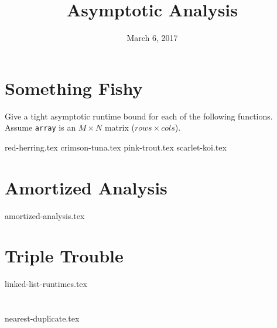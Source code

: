 \documentclass{exam}
\title{Asymptotic Analysis}
\date{March 6, 2017}
\begin{document}
\maketitle

\section{Something Fishy}
Give a tight asymptotic runtime bound for each of the following functions. Assume \texttt{array} is an $M \times N$ matrix ($rows \times cols$).
\begin{questions}
{red-herring.tex}
{crimson-tuna.tex}
{pink-trout.tex}
{scarlet-koi.tex}
\end{questions}

\section{Amortized Analysis}
\begin{questions}
{amortized-analysis.tex}
\end{questions}

\clearpage

\section{Triple Trouble}
\begin{questions}
{linked-list-runtimes.tex}
\end{questions}

\clearpage

\section{}
\begin{questions}
{nearest-duplicate.tex}
\end{questions}
\end{document}
